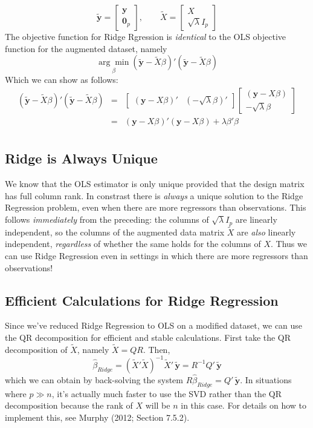 \documentclass[12pt]{article}
\theoremstyle{definition}
\begin{document}
$$\widetilde{\textbf{y}} = \left[ \begin{array}
	{c} \textbf{y} \\ \textbf{0}_p
\end{array}\right], \quad \quad \widetilde{X} = \left[ \begin{array}
	{c} X \\ \sqrt{\lambda} I_p
\end{array}\right]$$
The objective function for Ridge Rgression is \emph{identical} to the OLS objective function for the augmented dataset, namely
	$$\underset{\beta}{\arg \min} \left(\widetilde{\mathbf{y}} - \widetilde{X}\beta\right)'\left(\widetilde{\mathbf{y}} - \widetilde{X}\beta\right)$$
Which we can show as follows:
\begin{eqnarray*}
	\left(\widetilde{\mathbf{y}} - \widetilde{X}\beta\right)'\left(\widetilde{\mathbf{y}} - \widetilde{X}\beta\right) &=& \left[\begin{array}
		{cc} (\mathbf{y} - X\beta)' & (-\sqrt{\lambda}\beta)'
	\end{array} \right] \left[\begin{array}
		{c} (\mathbf{y} - X\beta) \\ -\sqrt{\lambda} \beta
	\end{array} \right]\\
		&=& (\mathbf{y} - X\beta)' (\mathbf{y} - X\beta) + \lambda \beta'\beta\\
\end{eqnarray*}

\subsection{Ridge is Always Unique} We know that the OLS estimator is only unique provided that the design matrix has full column rank. In constrast there is \emph{always} a unique solution to the Ridge Regression problem, even when there are more regressors than observations. This follows \emph{immediately} from the preceding: the columns of $\sqrt{\lambda}I_p$ are linearly independent, so the columns of the augmented data matrix $\widetilde{X}$ are \emph{also} linearly independent, \emph{regardless} of whether the same holds for the columns of $X$. Thus we can use Ridge Regression even in settings in which there are more regressors than observations!

\subsection{Efficient Calculations for Ridge Regression}
Since we've reduced Ridge Regression to OLS on a modified dataset, we can use the QR decomposition for efficient and stable calculations. First take the QR decomposition of $\widetilde{X}$, namely $\widetilde{X} = QR$. Then, 
	$$\widehat{\beta}_{Ridge} = (\widetilde{X}' \widetilde{X})^{-1} \widetilde{X}'\,\widetilde{\textbf{y}} = R^{-1} Q' \,\widetilde{\textbf{y}}$$
which we can obtain by back-solving the system $R\widehat{\beta}_{Ridge} = Q'\, \widetilde{\mathbf{y}}$. In situations where $p \gg n$, it's actually much faster to use the SVD rather than the QR decomposition because the rank of $X$ will be $n$ in this case. For details on how to implement this, see Murphy (2012; Section 7.5.2).
\end{document}
